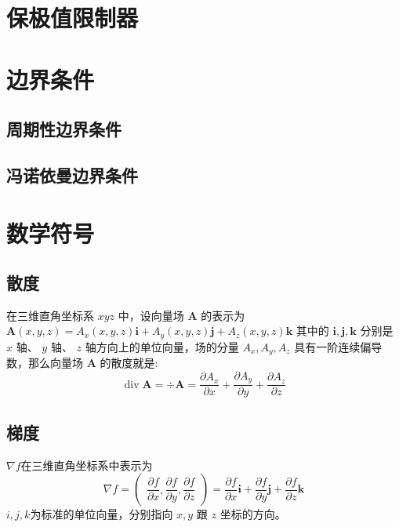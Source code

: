 \documentclass{article}
\numberwithin{equation}{subsection}    %
\begin{document}
\section{保极值限制器}

\newpage
\begin{appendix}
    \section{边界条件}
    \subsection{周期性边界条件}
    \subsection{冯诺依曼边界条件}
    \section{数学符号}
    \subsection{散度}
    在三维直角坐标系  $x y z$  中，设向量场  $\boldsymbol{A}$  的表示为
    $\boldsymbol{A}(x, y, z)=A_{x}(x, y, z) \boldsymbol{i}+A_{y}(x, y, z) \boldsymbol{j}+A_{z}(x, y, z) \boldsymbol{k}$ 其中的  $\boldsymbol{i}, \boldsymbol{j}, \boldsymbol{k} $ 分别是  $x$  轴、  $y$  轴、  $z$  轴方向上的单位向量，场的分量  $A_{x}, A_{y}, A_{z}$  具有一阶连续偏导数，那么向量场  $\boldsymbol{A}$  的散度就是:
    \begin{equation}
        \operatorname{div} \boldsymbol{A}=\div \boldsymbol{A}=\dfrac{\partial A_{x}}{\partial x}+\dfrac{\partial A_{y}}{\partial y}+\dfrac{\partial A_{z}}{\partial z}
    \end{equation}
    \subsection{梯度}
    $\nabla f$在三维直角坐标系中表示为
    \begin{equation}
        {\displaystyle \nabla f={\begin{pmatrix}{\dfrac {\partial f}{\partial x}},{\dfrac {\partial f}{\partial y}},{\dfrac {\partial f}{\partial z}}\end{pmatrix}}={\dfrac {\partial f}{\partial x}}\mathbf {i} +{\dfrac {\partial f}{\partial y}}\mathbf {j} +{\dfrac {\partial f}{\partial z}}\mathbf {k} }
    \end{equation}
    $i, j, k $为标准的单位向量，分别指向 $x, y$ 跟 $z$ 坐标的方向。

\end{appendix}
\end{document}
